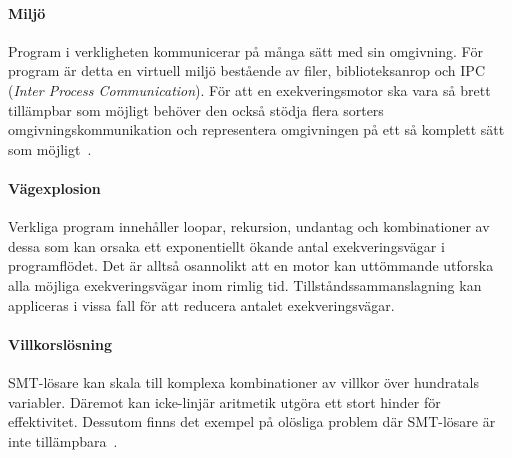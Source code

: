 \paragraph{Miljö} Program i verkligheten kommunicerar på många sätt med sin
omgivning. För program är detta en virtuell miljö bestående av filer,
biblioteksanrop och IPC (\emph{Inter Process Communication}). För att en
exekveringsmotor ska vara så brett tillämpbar som möjligt behöver den
också stödja flera sorters omgivningskommunikation och representera omgivningen
på ett så komplett sätt som möjligt~\cite{survey_symb_exc}.

\paragraph{Vägexplosion} Verkliga program innehåller loopar, rekursion,
undantag och kombinationer av dessa som kan orsaka ett exponentiellt ökande
antal exekveringsvägar i programflödet. Det är alltså osannolikt att en motor
kan uttömmande utforska alla möjliga exekveringsvägar inom rimlig tid.
Tillståndssammanslagning kan appliceras i vissa fall för att reducera antalet
exekveringsvägar.

\paragraph{Villkorslösning} SMT-lösare kan skala till komplexa kombinationer av
villkor över hundratals variabler. Däremot kan icke-linjär aritmetik utgöra ett
stort hinder för effektivitet. Dessutom finns det exempel på olösliga problem
där SMT-lösare är inte tillämpbara~\cite{survey_symb_exc}.

